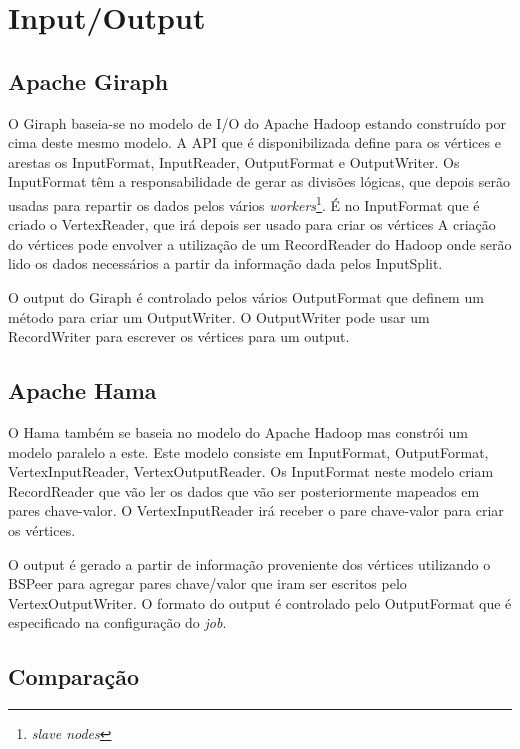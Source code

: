 \newpage
\section{Input/Output}

\subsection*{Apache Giraph}
O Giraph baseia-se no modelo de I/O do Apache Hadoop estando construído por cima deste mesmo modelo.
A API que é disponibilizada define para os vértices e arestas os InputFormat, InputReader, OutputFormat e OutputWriter.
Os InputFormat têm a responsabilidade de gerar as divisões lógicas, que depois serão usadas para repartir os dados pelos vários
\textit{workers}\footnote{\textit{slave nodes}}. É no InputFormat que é criado o VertexReader, que irá depois ser usado para criar os vértices
A criação do vértices pode envolver a utilização de um RecordReader do Hadoop onde serão lido os dados necessários a partir da informação dada pelos
InputSplit.

O output do Giraph é controlado pelos vários OutputFormat que definem um método para criar um OutputWriter. O OutputWriter pode usar um RecordWriter
para escrever os vértices para um output.

\subsection*{Apache Hama}

O Hama também se baseia no modelo do Apache Hadoop mas constrói um modelo paralelo a este.
Este modelo consiste em InputFormat, OutputFormat, VertexInputReader, VertexOutputReader. Os InputFormat neste modelo criam RecordReader 
que vão ler os dados que vão ser posteriormente mapeados em pares chave-valor. O VertexInputReader irá receber o pare chave-valor para criar os
vértices.

O output é gerado a partir de informação proveniente dos vértices utilizando o BSPeer para agregar pares chave/valor que iram
ser escritos pelo VertexOutputWriter. O formato do output é controlado pelo OutputFormat que é especificado na
configuração do \textit{job}.


\subsection*{Comparação}

